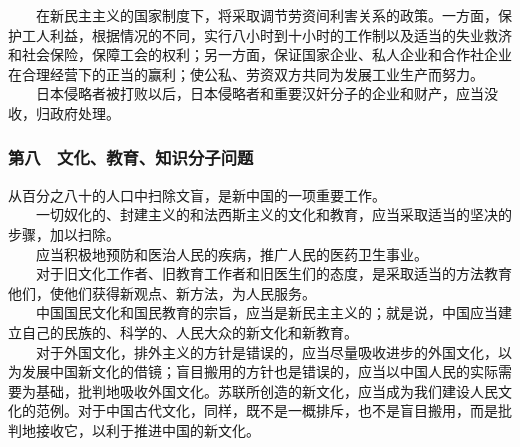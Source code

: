 \documentclass[cn,11pt,chinese]{elegantbook}
\def\myformat#1{\hfil\hfil #1}
\begin{document}
　　在新民主主义的国家制度下，将采取调节劳资间利害关系的政策。一方面，保护工人利益，根据情况的不同，实行八小时到十小时的工作制以及适当的失业救济和社会保险，保障工会的权利；另一方面，保证国家企业、私人企业和合作社企业在合理经营下的正当的赢利；使公私、劳资双方共同为发展工业生产而努力。\\
　　日本侵略者被打败以后，日本侵略者和重要汉奸分子的企业和财产，应当没收，归政府处理。\\
\subsubsection*{\myformat{第八　文化、教育、知识分子问题}}
从百分之八十的人口中扫除文盲，是新中国的一项重要工作。\\
　　一切奴化的、封建主义的和法西斯主义的文化和教育，应当采取适当的坚决的步骤，加以扫除。\\
　　应当积极地预防和医治人民的疾病，推广人民的医药卫生事业。\\
　　对于旧文化工作者、旧教育工作者和旧医生们的态度，是采取适当的方法教育他们，使他们获得新观点、新方法，为人民服务。\\
　　中国国民文化和国民教育的宗旨，应当是新民主主义的；就是说，中国应当建立自己的民族的、科学的、人民大众的新文化和新教育。\\
　　对于外国文化，排外主义的方针是错误的，应当尽量吸收进步的外国文化，以为发展中国新文化的借镜；盲目搬用的方针也是错误的，应当以中国人民的实际需要为基础，批判地吸收外国文化。苏联所创造的新文化，应当成为我们建设人民文化的范例。对于中国古代文化，同样，既不是一概排斥，也不是盲目搬用，而是批判地接收它，以利于推进中国的新文化。\\
\end{document}
